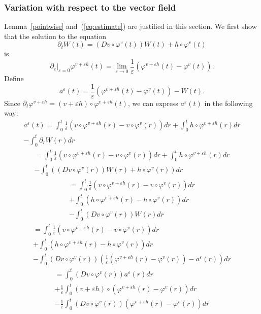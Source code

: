\documentclass[a5paper,10pt,twoside]{article}
\theoremstyle{plain}
\theoremstyle{definition}
\theoremstyle{remark}
\begin{document}
\subsubsection{Variation with respect to the vector field}
Lemma~\ref{pointwise} and~(\ref{eq:estimate}) are justified in this section. We first show that the solution to the equation
\[
\partial_t W(t)=\left(Dv\circ \varphi^v(t)\right)W(t)+h\circ \varphi^v(t)
\]
is
\[
\left.\partial_\varepsilon\right|_{\varepsilon=0}\varphi^{v+\varepsilon h}(t)=\lim_{\varepsilon\to 0}\frac{1}{\varepsilon}\left(\varphi^{v+\varepsilon h}(t)-\varphi^v(t)\right).
\]
Define
\[
a^\varepsilon(t)=\frac{1}{\varepsilon}\left(\varphi^{v+\varepsilon h}(t)-\varphi^v(t)\right)-W(t).
\]
Since $\partial_t\varphi^{v+\varepsilon h}=(v+\varepsilon h)\circ\varphi^{v+\varepsilon h}(t)$, we can express $a^\varepsilon(t)$ in the following way:
%
\begin{multline*}
a^\varepsilon(t)=\int_0^t \frac{1}{\varepsilon}\left(v\circ\varphi^{v+\varepsilon h}(r)-v\circ\varphi^v(r)\right)dr+\int_0^t h\circ \varphi^{v+\varepsilon h}(r)dr \\-\int_0^t\partial_rW(r)dr
\end{multline*}
\begin{multline*}
=\int_0^t \frac{1}{\varepsilon}\left(v\circ\varphi^{v+\varepsilon h}(r)-v\circ\varphi^v(r)\right)dr+\int_0^t h\circ \varphi^{v+\varepsilon h}(r)dr \\-\int_0^t\left(\left(Dv\circ \varphi^v(r)\right)W(r)+h\circ \varphi^v(r)\right)dr
\end{multline*}
\begin{multline*}
=\int_0^t \frac{1}{\varepsilon}\left(v\circ\varphi^{v+\varepsilon h}(r)-v\circ\varphi^v(r)\right)dr\\+\int_0^t \left(h\circ \varphi^{v+\varepsilon h}(r)-h\circ \varphi^v(r)\right)dr \\-\int_0^t\left(Dv\circ \varphi^v(r)\right)W(r)dr
\end{multline*}
\begin{multline*}
=\int_0^t \frac{1}{\varepsilon}\left(v\circ\varphi^{v+\varepsilon h}(r)-v\circ\varphi^v(r)\right)dr\\+\int_0^t \left(h\circ \varphi^{v+\varepsilon h}(r)-h\circ \varphi^v(r)\right)dr \\-\int_0^t\left(Dv\circ \varphi^v(r)\right)\left(\frac{1}{\varepsilon}\left(\varphi^{v+\varepsilon h}(r)-\varphi^v(r)\right)-a^\varepsilon(r)\right)dr
\end{multline*}
\begin{multline*}
=\int_0^t\left(Dv\circ \varphi^v(r)\right)a^\varepsilon(r)dr\\+\frac{1}{\varepsilon}\int_0^t (v+\varepsilon h)\circ\left(\varphi^{v+\varepsilon h}(r)-\varphi^v(r)\right)dr \\-\frac{1}{\varepsilon}\int_0^t\left(Dv\circ \varphi^v(r)\right)\left(\varphi^{v+\varepsilon h}(r)-\varphi^v(r)\right)dr
\end{multline*}
\end{document}

